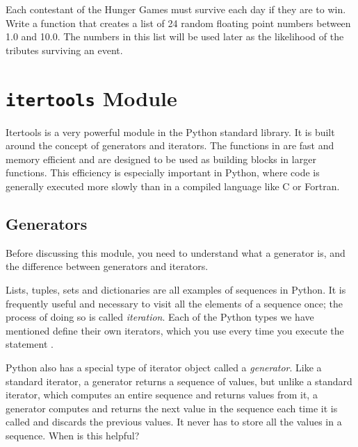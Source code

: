 \begin{problem}
Each contestant of the Hunger Games must survive each day if they are to win. Write a function that creates a list of 24 random floating point numbers between 1.0 and 10.0. The numbers in this list will be used later as the likelihood of the tributes surviving an event.
\end{problem}

\section*{\texttt{itertools} Module}
Itertools is a very powerful module in the Python standard library. It is built around the concept
of generators and iterators.  The functions in  are fast and memory efficient and are designed to be used as
building blocks in larger functions. 
This efficiency is especially important in Python, where code is generally executed more slowly than in a compiled language like C or Fortran.

\subsection*{Generators}
Before discussing this module, you need to understand what a generator is, and the difference between generators and iterators.

Lists, tuples, sets and dictionaries are all examples of sequences in Python. It is frequently useful and necessary to visit all the elements of a sequence once; the process of doing so is called \emph{iteration}.
Each of the Python types we have mentioned define their own iterators, which you use every time you execute the statement .

Python also has a special type of iterator object called a \emph{generator}.
Like a standard iterator, a generator returns a sequence of values, but unlike a standard iterator, which computes an entire sequence and returns values from it, a generator computes and returns the next value in the sequence each time it is called and discards the previous values. It never has to store all the values in a sequence. When is this helpful?

